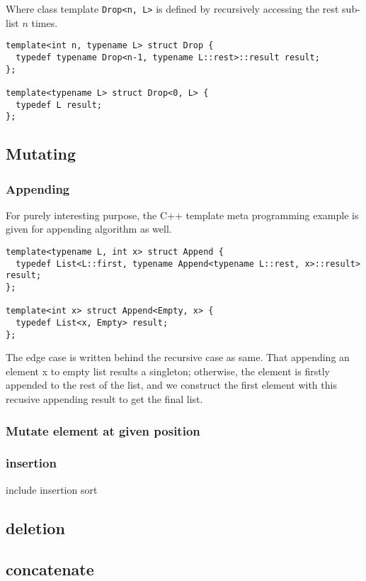 \documentclass{article}
\begin{document}
Where class template \verb|Drop<n, L>| is defined by recursively accessing the rest sub-list $n$ times.

\begin{lstlisting}
template<int n, typename L> struct Drop {
  typedef typename Drop<n-1, typename L::rest>::result result;
};

template<typename L> struct Drop<0, L> {
  typedef L result;
};
\end{lstlisting}

\subsection{Mutating}

\subsubsection{Appending}
For purely interesting purpose, the C++ template meta programming example is given for appending algorithm
as well.

\begin{lstlisting}
template<typename L, int x> struct Append {
  typedef List<L::first, typename Append<typename L::rest, x>::result> result;
};

template<int x> struct Append<Empty, x> {
  typedef List<x, Empty> result;
};
\end{lstlisting}

The edge case is written behind the recursive case as same. That appending an element x to empty list
results a singleton; otherwise, the element is firstly appended to the rest of the list, and we
construct the first element with this recusive appending result to get the final list.

\subsubsection{Mutate element at given position}


\subsubsection{insertion}

include insertion sort

\subsection{deletion}

\subsection{concatenate}
\end{document}
